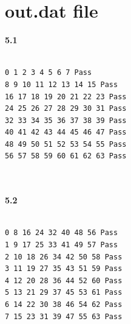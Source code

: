 \documentclass{article}
\begin{document}
\section{out.dat file}
\textbf{5.1}
\begin{lstlisting}

0 1 2 3 4 5 6 7 Pass
8 9 10 11 12 13 14 15 Pass
16 17 18 19 20 21 22 23 Pass
24 25 26 27 28 29 30 31 Pass
32 33 34 35 36 37 38 39 Pass
40 41 42 43 44 45 46 47 Pass
48 49 50 51 52 53 54 55 Pass
56 57 58 59 60 61 62 63 Pass



\end{lstlisting}
\vspace{3cm}
\textbf{5.2}
\begin{lstlisting}

0 8 16 24 32 40 48 56 Pass
1 9 17 25 33 41 49 57 Pass
2 10 18 26 34 42 50 58 Pass
3 11 19 27 35 43 51 59 Pass
4 12 20 28 36 44 52 60 Pass
5 13 21 29 37 45 53 61 Pass
6 14 22 30 38 46 54 62 Pass
7 15 23 31 39 47 55 63 Pass



\end{lstlisting}
\vspace{10cm}
\end{document}
